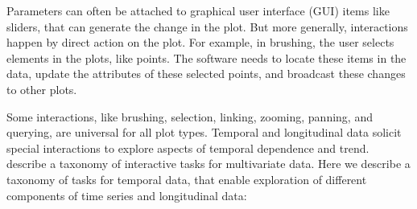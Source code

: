\documentclass[12pt]{article}
\begin{document}
Parameters can often be attached to graphical user interface (GUI) items like sliders, that can generate the change in the plot. But more generally, interactions happen by direct action on the plot. For example, in brushing, the user selects elements in the plots, like points. The software needs to locate these items in the data, update the attributes of these selected points, and broadcast these changes to other plots. 




Some interactions, like brushing, selection, linking, zooming, panning, and querying, are universal for all plot types. Temporal and longitudinal data solicit special interactions to explore aspects of temporal dependence and trend. %
\citet{Buja1996} describe a taxonomy of interactive tasks for multivariate data. Here we describe a taxonomy of tasks for temporal data, that enable exploration of different components of time series and longitudinal data:
\end{document}
